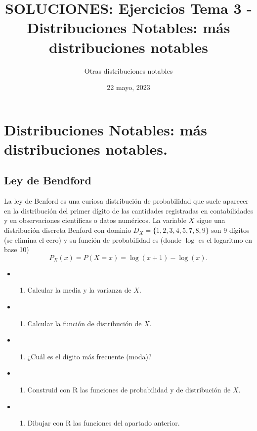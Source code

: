 \documentclass[
]{article}
\title{SOLUCIONES: Ejercicios Tema 3 - Distribuciones Notables: más
distribuciones notables}
\author{Otras distribuciones notables}
\date{22 mayo, 2023}
\providecommand{\tightlist}{%
  \setlength{\itemsep}{0pt}\setlength{\parskip}{0pt}}
\begin{document}
\maketitle

{
\hypersetup{linkcolor=blue}
\setcounter{tocdepth}{2}
\tableofcontents
}
\hypertarget{distribuciones-notables-muxe1s-distribuciones-notables.}{%
\section{Distribuciones Notables: más distribuciones
notables.}\label{distribuciones-notables-muxe1s-distribuciones-notables.}}

\hypertarget{ley-de-bendford}{%
\subsection{\texorpdfstring{\textbf{Ley de
Bendford}}{Ley de Bendford}}\label{ley-de-bendford}}

La ley de Benford es una curiosa distribución de probabilidad que suele
aparecer en la distribución del primer dígito de las cantidades
registradas en contabilidades y en observaciones científicas o datos
numéricos. La variable \(X\) sigue una distribución discreta Benford con
dominio \(D_X=\{1,2,3,4,5,7,8,9\}\) son 9 dígitos (se elimina el cero) y
su función de probabilidad es (donde \(\log\) es el logaritmo en base
10) \[
P_X(x)=P(X=x)=\log(x+1)-\log(x).
\]

\begin{itemize}
\item
  \begin{enumerate}
  \def\labelenumi{\alph{enumi})}
  \tightlist
  \item
    Calcular la media y la varianza de \(X\).
  \end{enumerate}
\item
  \begin{enumerate}
  \def\labelenumi{\alph{enumi})}
  \setcounter{enumi}{1}
  \tightlist
  \item
    Calcular la función de distribución de \(X\).
  \end{enumerate}
\item
  \begin{enumerate}
  \def\labelenumi{\alph{enumi})}
  \setcounter{enumi}{2}
  \tightlist
  \item
    ¿Cuál es el dígito más frecuente (moda)?
  \end{enumerate}
\item
  \begin{enumerate}
  \def\labelenumi{\alph{enumi})}
  \setcounter{enumi}{3}
  \tightlist
  \item
    Construid con R las funciones de probabilidad y de distribución de
    \(X\).
  \end{enumerate}
\item
  \begin{enumerate}
  \def\labelenumi{\alph{enumi})}
  \setcounter{enumi}{4}
  \tightlist
  \item
    Dibujar con R las funciones del apartado anterior.
  \end{enumerate}
\end{itemize}
\end{document}
